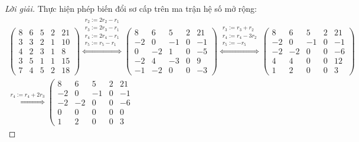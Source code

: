 \documentclass[class=nhvh-linear-algebra,crop=false]{standalone}
\begin{document}
\begin{proof}[Lời giải]
	\par Thực hiện phép biến đổi sơ cấp trên ma trận hệ số mở rộng:
	\begingroup{}
	\allowdisplaybreaks{}
	\begin{gather*}
		\left(
		\begin{array}{cccc|c}
				8 & 6 & 5 & 2 & 21 \\
				3 & 3 & 2 & 1 & 10 \\
				4 & 2 & 3 & 1 & 8  \\
				3 & 5 & 1 & 1 & 15 \\
				7 & 4 & 5 & 2 & 18
			\end{array}
		\right)
		\stackrel{
			\substack{
				r_{2}:= 2r_{2} {-} r_{1} \\
				r_{3}:= 2r_{3} {-} r_{1} \\
				r_{4}:= 2r_{4} {-} r_{1} \\
				r_{5}:= r_{5} {-} r_{1}
			}
		}{\Longleftrightarrow}
		\left(\begin{array}{cccc|c}
				8  & 6  & 5  & 2 & 21 \\
				-2 & 0  & -1 & 0 & -1 \\
				0  & -2 & 1  & 0 & -5 \\
				-2 & 4  & -3 & 0 & 9  \\
				-1 & -2 & 0  & 0 & -3
			\end{array}
		\right)
		\stackrel{
		\substack{
		r_{3}:= r_{3} + r_{2} \\
		r_{4}:= r_{4} {-} 3r_{2} \\
		r_{5}:= -r_{5}
		}
		}{\Longleftrightarrow}
		\left(\begin{array}{cccc|c}
				8  & 6  & 5  & 2 & 21 \\
				-2 & 0  & -1 & 0 & -1 \\
				-2 & -2 & 0  & 0 & -6 \\
				4  & 4  & 0  & 0 & 12 \\
				1  & 2  & 0  & 0 & 3
			\end{array}
		\right) \\
		\stackrel{
			r_{4}:= r_{4} + 2r_{3}
		}{\Longleftrightarrow}
		\left(\begin{array}{cccc|c}
				8  & 6  & 5  & 2 & 21 \\
				-2 & 0  & -1 & 0 & -1 \\
				-2 & -2 & 0  & 0 & -6 \\
				0  & 0  & 0  & 0 & 0  \\
				1  & 2  & 0  & 0 & 3
			\end{array}

\end{gather*}
\end{proof}
\end{document}

